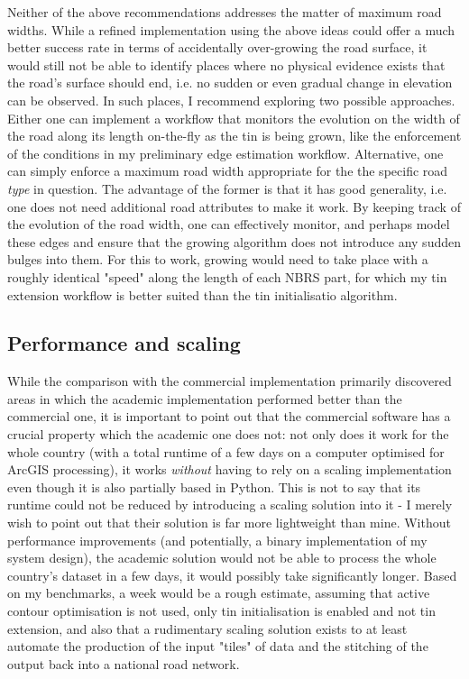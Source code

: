 Neither of the above recommendations addresses the matter of maximum road widths. While a refined implementation using the above ideas could offer a much better success rate in terms of accidentally over-growing the road surface, it would still not be able to identify places where no physical evidence exists that the road's surface should end, i.e. no sudden or even gradual change in elevation can be observed. In such places, I recommend exploring two possible approaches. Either one can implement a workflow that monitors the evolution on the width of the road along its length on-the-fly as the \ac{tin} is being grown, like the enforcement of the conditions in my preliminary edge estimation workflow. Alternative, one can simply enforce a maximum road width appropriate for the the specific road \textit{type} in question. The advantage of the former is that it has good generality, i.e. one does not need additional road attributes to make it work. By keeping track of the evolution of the road width, one can effectively monitor, and perhaps model these edges and ensure that the growing algorithm does not introduce any sudden bulges into them. For this to work, growing would need to take place with a roughly identical "speed" along the length of each NBRS part, for which my \ac{tin} extension workflow is better suited than the \ac{tin} initialisatio algorithm.

\subsection{Performance and scaling}
\label{sub:improvementsperformance}

While the comparison with the commercial implementation primarily discovered areas in which the academic implementation performed better than the commercial one, it is important to point out that the commercial software has a crucial property which the academic one does not: not only does it work for the whole country (with a total runtime of a few days on a computer optimised for ArcGIS processing), it works \textit{without} having to rely on a scaling implementation even though it is also partially based in Python. This is not to say that its runtime could not be reduced by introducing a scaling solution into it - I merely wish to point out that their solution is far more lightweight than mine. Without performance improvements (and potentially, a binary implementation of my system design), the academic solution would not be able to process the whole country's dataset in a few days, it would possibly take significantly longer. Based on my benchmarks, a week would be a rough estimate, assuming that active contour optimisation is not used, only \ac{tin} initialisation is enabled and not \ac{tin} extension, and also that a rudimentary scaling solution exists to at least automate the production of the input "tiles" of data and the stitching of the output back into a national road network.

